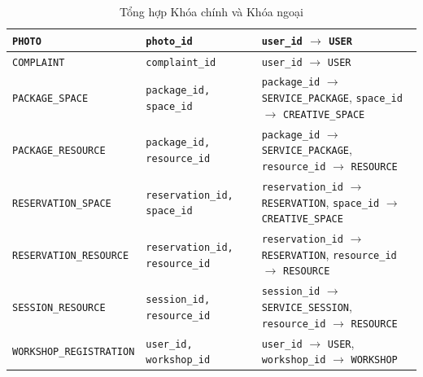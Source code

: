 \begin{table}[htbp]
\begin{tabular}{|l|l|l|}
        \texttt{PHOTO} & \texttt{photo\_id} & \texttt{user\_id} $\rightarrow$ \texttt{USER} \\ \hline
        \texttt{COMPLAINT} & \texttt{complaint\_id} & \texttt{user\_id} $\rightarrow$ \texttt{USER} \\ \hline
        \texttt{PACKAGE\_SPACE} & \texttt{package\_id, space\_id} & \texttt{package\_id} $\rightarrow$ \texttt{SERVICE\_PACKAGE}, \texttt{space\_id} $\rightarrow$ \texttt{CREATIVE\_SPACE} \\ \hline
        \texttt{PACKAGE\_RESOURCE} & \texttt{package\_id, resource\_id} & \texttt{package\_id} $\rightarrow$ \texttt{SERVICE\_PACKAGE}, \texttt{resource\_id} $\rightarrow$ \texttt{RESOURCE} \\ \hline
        \texttt{RESERVATION\_SPACE} & \texttt{reservation\_id, space\_id} & \texttt{reservation\_id} $\rightarrow$ \texttt{RESERVATION}, \texttt{space\_id} $\rightarrow$ \texttt{CREATIVE\_SPACE} \\ \hline
        \texttt{RESERVATION\_RESOURCE} & \texttt{reservation\_id, resource\_id} & \texttt{reservation\_id} $\rightarrow$ \texttt{RESERVATION}, \texttt{resource\_id} $\rightarrow$ \texttt{RESOURCE} \\ \hline
        \texttt{SESSION\_RESOURCE} & \texttt{session\_id, resource\_id} & \texttt{session\_id} $\rightarrow$ \texttt{SERVICE\_SESSION}, \texttt{resource\_id} $\rightarrow$ \texttt{RESOURCE} \\ \hline
        \texttt{WORKSHOP\_REGISTRATION} & \texttt{user\_id, workshop\_id} & \texttt{user\_id} $\rightarrow$ \texttt{USER}, \texttt{workshop\_id} $\rightarrow$ \texttt{WORKSHOP} \\ \hline
    \end{tabular}
    \caption{Tổng hợp Khóa chính và Khóa ngoại}
\end{table}

